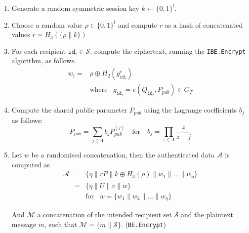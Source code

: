\documentclass[journal]{IEEEtran}
\newcommand{\id}[1]{\ensuremath{\mathtt{id}_{#1}}}
\begin{document}
\begin{description}
    \begin{enumerate}
        \item Generate a random symmetric session key $k \leftarrow \{ 0,1 \}^{l}$.
        \item Choose a random value $\rho \in \{ 0,1 \}^{l}$ and compute $r$ as a hash of concatenated values $r = H_3 \left( \{ \rho \parallel k \} \right)$
        \item For each recipient $\id{i} \in \mathcal{S}$, compute the ciphertext, running the \texttt{IBE.Encrypt} algorithm, as follows.
            \begin{equation*}
            \begin{array}{ll}
                w_i = & \rho \oplus H_2 \left( g_{\id{i}}^r \right)  \\ & \textrm{where} \; \; \; g_{\id{i}} = e \left( Q_{\id{i}}, P_{pub} \right) \in G_T
            \end{array}
            \end{equation*}
            \item Compute the shared public parameter $P_{pub}$ using the Lagrange coefficients $b_j$ as follows:
        \begin{equation*}
         P_{pub} = \sum_{j \in \Lambda} b_j P_{pub}^{\left( j \right)} \quad \textrm{for} \quad b_j = \prod_{z \in \Lambda} \frac{z}{z-j}
        \end{equation*}
        \item Let $w$ be a randomised concatenation, then the authenticated data $\mathcal{A}$ is computed as                                  
        \begin{equation*}
                \begin{array}{lcl}
                    \mathcal{A} & = & \{ \eta \parallel rP \parallel k \oplus H_3 \left( \rho \right) \parallel w_1  \parallel \ldots \parallel w_\eta \} \\
                    & = & \{ \eta \parallel U \parallel v \parallel w \} \\
                    & & \textrm{for}\; \; \; w = \{ w_1 \parallel w_2 \parallel \ldots \parallel w_\eta \}
                \end{array} 
            \end{equation*}
            
        And $\mathcal{M}$ a concatenation of the intended recipient set $\mathcal{S}$ and the plaintext message $m$, such that $\mathcal{M} = \{ m \parallel \mathcal{S} \}$. (\texttt{BE.Encrypt})
    

\end{enumerate}
\end{description}
\end{document}

